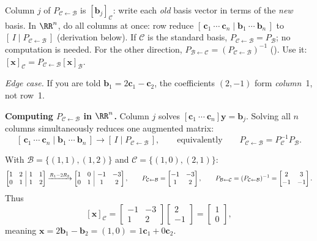 \documentclass[10pt]{scrartcl}
\makeatletter
\newcommand{\aug}[2]{\left[\begin{array}{@{}#1@{}}#2\end{array}\right]}
\newcommand{\vv}[1]{\mathbf{#1}}
\makeatother
\begin{document}
\begin{steps}
  \ii Column $j$ of $P_{\mathcal C\leftarrow\mathcal B}$ is $[\vv b_j]_{\mathcal C}$: write each \emph{old} basis vector in terms of the \emph{new} basis.
  \ii In $\RR^n$, do all columns at once: row reduce $[\,\vv c_1\ \cdots\ \vv c_n\mid\vv b_1\ \cdots\ \vv b_n\,]$ to $[\,I\mid P_{\mathcal C\leftarrow\mathcal B}\,]$ (derivation below).
  \ii If $\mathcal C$ is the standard basis, $P_{\mathcal C\leftarrow\mathcal B}=P_{\mathcal B}$; no computation is needed.
  \ii For the other direction, $P_{\mathcal B\leftarrow\mathcal C}=(P_{\mathcal C\leftarrow\mathcal B})^{-1}$ ().
  \ii Use it: $[\vv x]_{\mathcal C}=P_{\mathcal C\leftarrow\mathcal B}[\vv x]_{\mathcal B}$.
\end{steps}
\emph{Edge case.} If you are told $\vv b_1=2\vv c_1-\vv c_2$, the coefficients $(2,-1)$ form \emph{column}~1, not row~1.

\noindent\textbf{Computing $P_{\mathcal C\leftarrow\mathcal B}$ in $\RR^n$.} Column $j$ solves $[\vv c_1\ \cdots\ \vv c_n]\vv y=\vv b_j$. Solving all $n$ columns simultaneously reduces one augmented matrix:
\[
  [\,\vv c_1\ \cdots\ \vv c_n \mid \vv b_1\ \cdots\ \vv b_n\,] \longrightarrow [\,I \mid P_{\mathcal C\leftarrow\mathcal B}\,],
  \qquad\text{equivalently}\qquad P_{\mathcal C\leftarrow\mathcal B} = P_{\mathcal C}^{-1} P_{\mathcal B}.
\]

\revisit With $\mathcal B=\{(1,1),(1,2)\}$ and $\mathcal C=\{(1,0),(2,1)\}$:
\[
  \aug{cc|cc}{1&2&1&1\\0&1&1&2}
  \xrightarrow{R_1-2R_2}
  \aug{cc|cc}{1&0&-1&-3\\0&1&1&2},
  \qquad
  P_{\mathcal C\leftarrow\mathcal B} = \begin{bmatrix}-1&-3\\1&2\end{bmatrix}, \qquad
  P_{\mathcal B\leftarrow\mathcal C} = (P_{\mathcal C\leftarrow\mathcal B})^{-1} = \begin{bmatrix}2&3\\-1&-1\end{bmatrix}.
\]
Thus
\[
  [\vv x]_{\mathcal C} = \begin{bmatrix}-1&-3\\1&2\end{bmatrix}\begin{bmatrix}2\\-1\end{bmatrix} = \begin{bmatrix}1\\0\end{bmatrix},
\]
meaning $\vv x=2\vv b_1-\vv b_2=(1,0)=1\vv c_1+0\vv c_2$.
\end{document}
